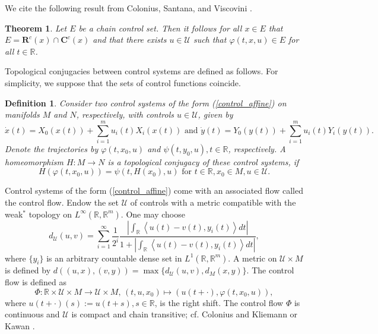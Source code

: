 \documentclass[preprint,12pt]{elsarticle}
\newtheorem{definition}{Definition}
\newtheorem{theorem}{Theorem}
\begin{document}
We cite the following result from Colonius, Santana, and Viscovini
\cite[Theorem 2.14 (iii)]{ColSV24}.

\begin{theorem}
\label{Theorem_E_omega}Let $E$ be a chain control set. Then it follows for all
$x\in E$ that $E=\mathbf{R}^{c}(x)\cap\mathbf{C}^{c}(x)$ and that there exists
$u\in\mathcal{U}$ such that $\varphi(t,x,u)\in E$ for all $t\in\mathbb{R}$.
\end{theorem}

Topological conjugacies between control systems are defined as follows. For
simplicity, we suppose that the sets of control functions coincide.

\begin{definition}
\label{Definition_conjugacy}Consider two control systems of the form
(\ref{control_affine}) on manifolds $M$ and $N$, respectively, with controls
$u\in\mathcal{U}$, given by%
\begin{equation}
\dot{x}(t)=X_{0}(x(t))+\sum_{i=1}^{m}u_{i}(t)X_{i}(x(t))\text{ and }\dot
{y}(t)=Y_{0}(y(t))+\sum_{i=1}^{m}u_{i}(t)Y_{i}(y(t)). \label{control_con}%
\end{equation}
Denote the trajectories by $\varphi(t,x_{0},u)$ and $\psi(t,y_{0}%
,u),t\in\mathbb{R}$, respectively. A homeomorphism $H:M\rightarrow N$ is a
topological conjugacy of these control systems, if%
\[
H(\varphi(t,x_{0},u))=\psi(t,H(x_{0}),u)\text{ for }t\in\mathbb{R},x_{0}\in
M,u\in\mathcal{U}.
\]

\end{definition}

Control systems of the form (\ref{control_affine}) come with an associated
flow called the control flow. Endow the set $\mathcal{U}$ of controls with a
metric compatible with the weak$^{\ast}$ topology on $L^{\infty}%
(\mathbb{R},\mathbb{R}^{m})$. One may choose%
\begin{equation}
d_{\mathcal{U}}(u,v)=\sum_{i=1}^{\infty}\frac{1}{2^{i}}\frac{\left\vert
\int_{\mathbb{R}}\left\langle u(t)-v(t),y_{i}(t)\right\rangle dt\right\vert
}{1+\left\vert \int_{\mathbb{R}}\left\langle u(t)-v(t),y_{i}(t)\right\rangle
dt\right\vert }, \label{metric_U}%
\end{equation}
where $\{y_{i}\}$ is an arbitrary countable dense set in $L^{1}(\mathbb{R}%
,\mathbb{R}^{m})$. A metric on $\mathcal{U}\times M$ is defined by
$d((u,x),(v,y))=\max\{d_{\mathcal{U}}(u,v),d_{M}(x,y)\}$. The control flow is
defined as%
\begin{equation}
\Phi:\mathbb{R}\times\mathcal{U}\times M\rightarrow\mathcal{U}\times
M,\,(t,u,x_{0})\mapsto(u(t+\cdot),\varphi(t,x_{0},u)), \label{cflow}%
\end{equation}
where $u(t+\cdot)(s):=u(t+s),s\in\mathbb{R}$, is the right shift. The control
flow $\Phi$ is continuous and $\mathcal{U}$ is compact and chain transitive;
cf. Colonius and Kliemann \cite[Chapter 4]{ColK00} or Kawan \cite[Section
1.4]{Kawa13}.
\end{document}
